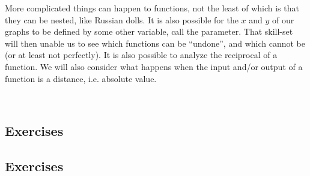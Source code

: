 

More complicated things can happen to functions, not the least of which is that they can be nested, 
like Russian dolls.  It is also possible for the $x$ and $y$ of our graphs to be defined by some
other variable, call the parameter.  That skill-set will then unable us to see which functions can
be ``undone'', and which cannot be (or at least not perfectly).  It is also possible 
to analyze the reciprocal of a function.   We will also consider what happens 
when the input and/or output of a function is a distance, i.e. absolute value.


\newpage
\chapterminitoc

\newpage
{}
\newpage

\newpage




\newpage
{}
\newpage

~\vfill
\subsection{Exercises}
\noindent{}
\newpage
\noindent{}
\newpage
\noindent{}
\newpage
\noindent{}



{}
\noindent{}
\newpage

\newpage
\subsection{Exercises}
\noindent{}
\newpage
\noindent{}
\newpage
\noindent{}
\newpage
\noindent{}



